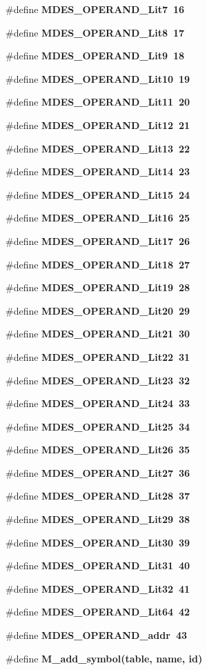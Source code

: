 \begin{CompactItemize}
\item 
\#define \bf{MDES\_\-OPERAND\_\-Lit7}~16
\item 
\#define \bf{MDES\_\-OPERAND\_\-Lit8}~17
\item 
\#define \bf{MDES\_\-OPERAND\_\-Lit9}~18
\item 
\#define \bf{MDES\_\-OPERAND\_\-Lit10}~19
\item 
\#define \bf{MDES\_\-OPERAND\_\-Lit11}~20
\item 
\#define \bf{MDES\_\-OPERAND\_\-Lit12}~21
\item 
\#define \bf{MDES\_\-OPERAND\_\-Lit13}~22
\item 
\#define \bf{MDES\_\-OPERAND\_\-Lit14}~23
\item 
\#define \bf{MDES\_\-OPERAND\_\-Lit15}~24
\item 
\#define \bf{MDES\_\-OPERAND\_\-Lit16}~25
\item 
\#define \bf{MDES\_\-OPERAND\_\-Lit17}~26
\item 
\#define \bf{MDES\_\-OPERAND\_\-Lit18}~27
\item 
\#define \bf{MDES\_\-OPERAND\_\-Lit19}~28
\item 
\#define \bf{MDES\_\-OPERAND\_\-Lit20}~29
\item 
\#define \bf{MDES\_\-OPERAND\_\-Lit21}~30
\item 
\#define \bf{MDES\_\-OPERAND\_\-Lit22}~31
\item 
\#define \bf{MDES\_\-OPERAND\_\-Lit23}~32
\item 
\#define \bf{MDES\_\-OPERAND\_\-Lit24}~33
\item 
\#define \bf{MDES\_\-OPERAND\_\-Lit25}~34
\item 
\#define \bf{MDES\_\-OPERAND\_\-Lit26}~35
\item 
\#define \bf{MDES\_\-OPERAND\_\-Lit27}~36
\item 
\#define \bf{MDES\_\-OPERAND\_\-Lit28}~37
\item 
\#define \bf{MDES\_\-OPERAND\_\-Lit29}~38
\item 
\#define \bf{MDES\_\-OPERAND\_\-Lit30}~39
\item 
\#define \bf{MDES\_\-OPERAND\_\-Lit31}~40
\item 
\#define \bf{MDES\_\-OPERAND\_\-Lit32}~41
\item 
\#define \bf{MDES\_\-OPERAND\_\-Lit64}~42
\item 
\#define \bf{MDES\_\-OPERAND\_\-addr}~43
\item 
\#define \bf{M\_\-add\_\-symbol}(table, \bf{name}, id)
\item 

\end{CompactItemize}
